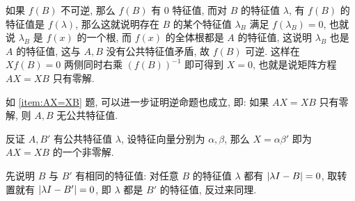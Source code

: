 \begin{exercise}[series=exer]
\begin{answer}
        如果 $ f(B) $ 不可逆, 那么 $ f(B) $ 有 $ 0 $ 特征值, 而对 $ B $ 的特征值 $ \lambda $, 有 $ f(B) $ 的特征值是 $ f(\lambda) $, 那么这就说明存在 $ B $ 的某个特征值 $ \lambda_{B} $ 满足 $ f(\lambda_{B}) = 0 $, 也就说 $ \lambda_{B} $ 是 $ f(x) $ 的一个根, 而 $ f(x) $ 的全体根都是 $ A $ 的特征值, 这说明 $ \lambda_{B} $ 也是 $ A $ 的特征值, 这与 $ A, B $ 没有公共特征值矛盾, 故 $ f(B) $ 可逆. 这样在 $ Xf(B) = 0 $ 两侧同时右乘 $ (f(B))^{-1} $ 即可得到 $ X = 0 $, 也就是说矩阵方程 $ AX = XB $ 只有零解.
    \end{answer}
    \item 如 \ref{item:AX=XB} 题, 可以进一步证明逆命题也成立, 即: 如果 $ AX = XB $ 只有零解, 则 $ A, B $ 无公共特征值.
    \begin{hint}
        反证 $ A, B' $ 有公共特征值 $ \lambda $, 设特征向量分别为 $ \alpha, \beta $, 那么 $ X = \alpha\beta' $ 即为 $ AX = XB $ 的一个非零解. 
    \end{hint}
    \begin{answer}
        先说明 $ B $ 与 $ B' $ 有相同的特征值: 对任意 $ B $ 的特征值 $ \lambda $ 都有 $ \abs{\lambda I - B} = 0 $, 取转置就有 $ \abs{\lambda I - B'} = 0 $, 即 $ \lambda $ 都是 $ B' $ 的特征值, 反过来同理. 


\end{answer}
\end{exercise}
